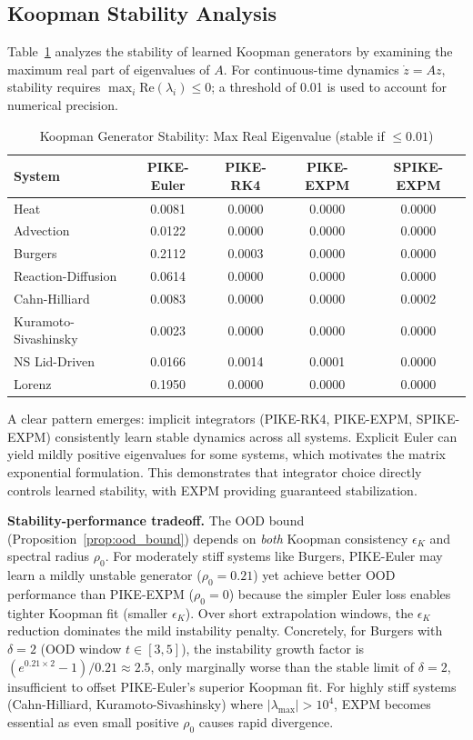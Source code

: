 \documentclass{article}
\theoremstyle{remark}
\begin{document}
\subsection{Koopman Stability Analysis}

Table~\ref{tab:stability} analyzes the stability of learned Koopman generators by examining the maximum real part of eigenvalues of $A$. For continuous-time dynamics $\dot{z} = Az$, stability requires $\max_i \text{Re}(\lambda_i) \leq 0$; a threshold of 0.01 is used to account for numerical precision.

\begin{table}[H]
\centering
\caption{Koopman Generator Stability: Max Real Eigenvalue (stable if $\leq 0.01$)}
\label{tab:stability}
\begin{tabular}{lcccc}
\toprule
System & PIKE-Euler & PIKE-RK4 & PIKE-EXPM & SPIKE-EXPM \\
\midrule
Heat & 0.0081 & 0.0000 & 0.0000 & 0.0000 \\
Advection & 0.0122 & 0.0000 & 0.0000 & 0.0000 \\
Burgers & 0.2112 & 0.0003 & 0.0000 & 0.0000 \\
Reaction-Diffusion & 0.0614 & 0.0000 & 0.0000 & 0.0000 \\
Cahn-Hilliard & 0.0083 & 0.0000 & 0.0000 & 0.0002 \\
Kuramoto-Sivashinsky & 0.0023 & 0.0000 & 0.0000 & 0.0000 \\
NS Lid-Driven & 0.0166 & 0.0014 & 0.0001 & 0.0000 \\
Lorenz & 0.1950 & 0.0000 & 0.0000 & 0.0000 \\
\bottomrule
\end{tabular}
\end{table}

A clear pattern emerges: implicit integrators (PIKE-RK4, PIKE-EXPM, SPIKE-EXPM) consistently learn stable dynamics across all systems. Explicit Euler can yield mildly positive eigenvalues for some systems, which motivates the matrix exponential formulation. This demonstrates that integrator choice directly controls learned stability, with EXPM providing guaranteed stabilization.

\textbf{Stability-performance tradeoff.} The OOD bound (Proposition~\ref{prop:ood_bound}) depends on \emph{both} Koopman consistency $\epsilon_K$ and spectral radius $\rho_0$. For moderately stiff systems like Burgers, PIKE-Euler may learn a mildly unstable generator ($\rho_0 = 0.21$) yet achieve better OOD performance than PIKE-EXPM ($\rho_0 = 0$) because the simpler Euler loss enables tighter Koopman fit (smaller $\epsilon_K$). Over short extrapolation windows, the $\epsilon_K$ reduction dominates the mild instability penalty. Concretely, for Burgers with $\delta = 2$ (OOD window $t \in [3,5]$), the instability growth factor is $(e^{0.21 \times 2} - 1)/0.21 \approx 2.5$, only marginally worse than the stable limit of $\delta = 2$, insufficient to offset PIKE-Euler's superior Koopman fit. For highly stiff systems (Cahn-Hilliard, Kuramoto-Sivashinsky) where $|\lambda_{\max}| > 10^4$, EXPM becomes essential as even small positive $\rho_0$ causes rapid divergence.
\end{document}
